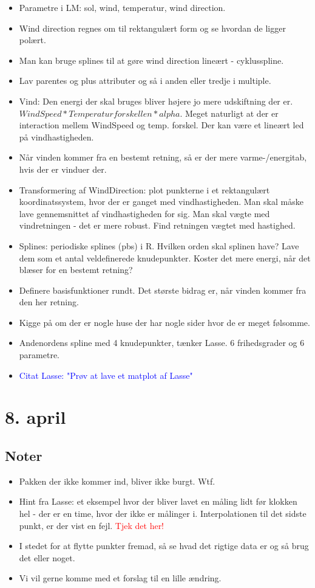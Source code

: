 \begin{itemize}
    \item Parametre i LM: sol, wind, temperatur, wind direction.
    \item Wind direction regnes om til rektangulært form og se hvordan de ligger polært. 
    \item Man kan bruge splines til at gøre wind direction lineært - cyklusspline. 
    \item Lav parentes og plus attributer og så i anden eller tredje i multiple.
    \item Vind: Den energi der skal bruges bliver højere jo mere udskiftning der er. $WindSpeed*Temperaturforskellen*alpha$. Meget naturligt at der er interaction mellem WindSpeed og temp. forskel. Der kan være et lineært led på vindhastigheden. 
    \item Når vinden kommer fra en bestemt retning, så er der mere varme-/energitab, hvis der er vinduer der. 
    \item Transformering af WindDirection: plot punkterne i et rektangulært koordinatssystem, hvor der er ganget med vindhastigheden. Man skal måske lave gennemsnittet af vindhastigheden for sig. Man skal vægte med vindretningen - det er mere robust. Find retningen vægtet med hastighed. 
    \item Splines: periodiske splines (pbs) i R. Hvilken orden skal splinen have? Lave dem som et antal veldefinerede knudepunkter. Koster det mere energi, når det blæser for en bestemt retning? 
    \item Definere basisfunktioner rundt. Det største bidrag er, når vinden kommer fra den her retning. 
    \item Kigge på om der er nogle huse der har nogle sider hvor de er meget følsomme. 
    \item Andenordens spline med 4 knudepunkter, tænker Lasse. 6 frihedsgrader og 6 parametre. 
    \item \textcolor{blue}{Citat Lasse: "Prøv at lave et matplot af Lasse"}
\end{itemize}

\pagebreak

\section{8. april}

\subsection{Noter}
\begin{itemize}
    \item Pakken der ikke kommer ind, bliver ikke burgt. Wtf.
    \item Hint fra Lasse: et eksempel hvor der bliver lavet en måling lidt før klokken hel - der er en time, hvor der ikke er målinger i. Interpolationen til det sidste punkt, er der vist en fejl. \textcolor{red}{Tjek det her!}
    \item I stedet for at flytte punkter fremad, så se hvad det rigtige data er og så brug det eller noget. 
    \item Vi vil gerne komme med et forslag til en lille ændring.
\end{itemize}

